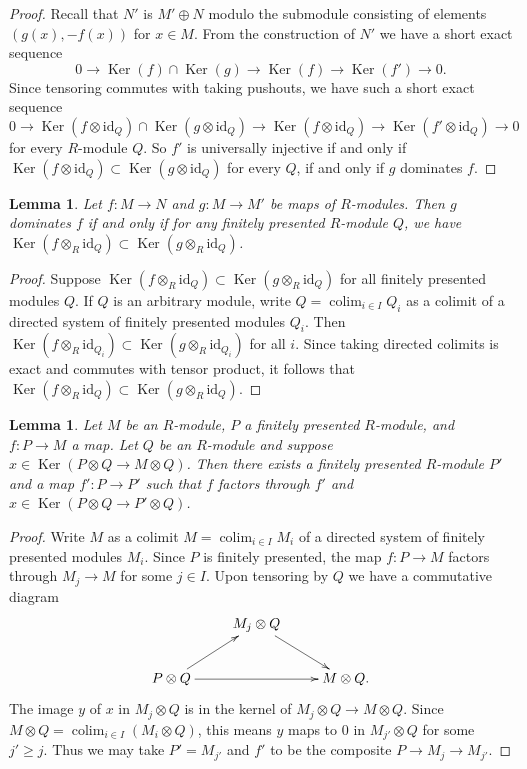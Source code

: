 \documentclass{amsart}
\theoremstyle{plain}
\newtheorem{lemma}[subsection]{Lemma}
\theoremstyle{definition}
\theoremstyle{remark}
\numberwithin{equation}{subsection}
\def\colim{\mathop{\mathrm{colim}}\nolimits}
\def\Ker{\mathop{\mathrm{Ker}}}
\begin{document}
\begin{proof}
Recall that $N'$ is $M' \oplus N$ modulo the submodule consisting of elements
$(g(x), -f(x))$ for $x \in M$.
From the construction of $N'$ we have a short exact sequence
$$
0 \to \Ker(f) \cap \Ker(g) \to \Ker(f) \to \Ker(f')
\to 0.
$$
Since tensoring commutes with taking pushouts, we have such a short exact
sequence
$$
0 \to \Ker(f \otimes \text{id}_Q ) \cap \Ker(g \otimes
\text{id}_Q) \to \Ker(f \otimes \text{id}_Q)
\to \Ker(f' \otimes \text{id}_Q) \to 0
$$
for every $R$-module $Q$.  So $f'$ is universally injective if and only if
$\Ker(f \otimes \text{id}_Q ) \subset \Ker(g \otimes
\text{id}_Q)$ for every $Q$, if and only if $g$ dominates $f$.
\end{proof}


\begin{lemma}
\label{lemma-domination-fp}
Let $f: M \to N$ and $g: M \to M'$ be maps of $R$-modules.
Then $g$ dominates $f$ if and only if for any finitely presented $R$-module
$Q$, we have $\Ker(f \otimes_R \text{id}_Q) \subset \Ker(g \otimes_R
\text{id}_Q)$.
\end{lemma}

\begin{proof}
Suppose $\Ker(f \otimes_R \text{id}_Q) \subset \Ker(g \otimes_R
\text{id}_Q)$ for all finitely presented modules $Q$.  If $Q$ is an
arbitrary module, write $Q = \colim_{i \in I} Q_i$ as a colimit of a
directed
system of finitely presented modules $Q_i$.  Then $\Ker(f \otimes_R
\text{id}_{Q_i}) \subset \Ker(g \otimes_R \text{id}_{Q_i})$ for
all $i$.  Since taking directed colimits is exact and commutes with tensor
product, it follows that $\Ker(f \otimes_R \text{id}_Q) \subset \Ker(g
\otimes_R \text{id}_Q)$.
\end{proof}


\begin{lemma}
\label{lemma-kernel-tensored-fp}
Let $M$ be an $R$-module, $P$ a finitely presented $R$-module, and $f: P
\to M$ a map.  Let $Q$ be an $R$-module and suppose $x \in \Ker(P
\otimes Q \to M \otimes Q)$.  Then there exists a finitely presented
$R$-module $P'$ and a map $f': P \to P'$ such that $f$ factors through
$f'$ and $x \in \Ker(P \otimes Q \to P' \otimes Q)$.
\end{lemma}

\begin{proof}
Write $M$ as a colimit $M = \colim_{i \in I} M_i$ of a directed system of
finitely presented modules $M_i$.  Since $P$ is finitely presented, the map $f:
P \to M$ factors through $M_j \to M$ for some $j \in I$.  Upon
tensoring by $Q$ we have a commutative diagram
$$
\xymatrix{
& M_j \otimes Q \ar[dr] & \\
P \otimes Q \ar[ur] \ar[rr] & & M \otimes Q .
}
$$
The image $y$ of $x$ in $M_j \otimes Q$ is in the kernel of $M_j \otimes Q
\to M \otimes Q$.  Since $M \otimes Q = \colim_{i \in I} (M_i
\otimes
Q)$, this means $y$ maps to $0$ in $M_{j'} \otimes Q$ for some $j' \geq j$.
Thus we may take $P' = M_{j'}$ and $f'$ to be the composite $P \to M_j
\to M_{j'}$.
\end{proof}
\end{document}
